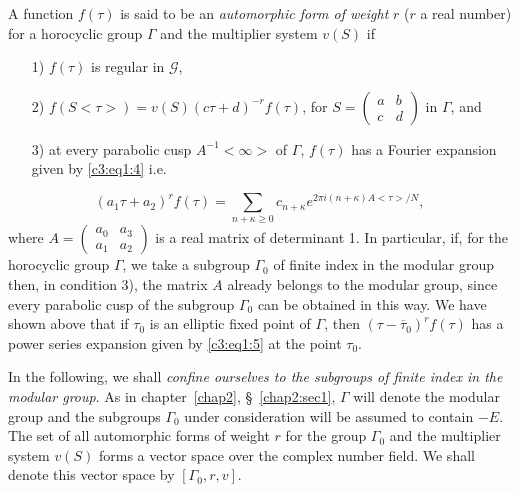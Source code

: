 \begin{defi*}
A function $f(\tau)$ is said to be an \textit{automorphic form of
  weight} $r$ ($r$ a real number) for a horocyclic group $\Gamma$ and
the multiplier system $v(S)$ if 
\begin{itemize}
\item[1)] $f(\tau)$ \pageoriginale is regular in $\mathscr{G}$, 

\item[2)] $f(S<\tau>)=v(S)(c\tau+d)^{-r}f(\tau)$, for $S =
  \left(\begin{smallmatrix} a&b\\c&d \end{smallmatrix} \right)$ in
  $\Gamma$, and 

\item[3)] at every parabolic cusp $A^{-1} <\infty>$ of $\Gamma$,
  $f(\tau)$ has a Fourier expansion given by \eqref{c3:eq1:4} i.e.
\end{itemize}
$$
(a_1\tau+a_2)^rf(\tau) = \sum_{n+\kappa \geq 0} c_{n+\kappa} e^{2\pi
  i(n+\kappa) A<\tau>/N},
$$
where $A=\left(\begin{smallmatrix} a_0&a_3\\a_1&a_2 \end{smallmatrix}
\right)$ is a real matrix of determinant 1. In particular, if, for the
horocyclic group $\Gamma$, we take a subgroup $\Gamma_0$ of finite
index in the modular group then, in condition 3), the matrix $A$
already belongs to the modular group, since every parabolic cusp of
the subgroup $\Gamma_0$ can be obtained in this way. We have shown
above that if $\tau_0$ is an elliptic fixed point of $\Gamma$, then
$(\tau-\overline{\tau}_0)^rf(\tau)$ has a power series expansion given
by \eqref{c3:eq1:5} at the point $\tau_0$. 
\end{defi*}

In the following, we shall \textit{confine ourselves to the subgroups
  of finite index in the modular group}. As in chapter~\ref{chap2}, 
\S~\ref{chap2:sec1}, $\Gamma$ will denote the modular group and the subgroups $\Gamma_0$
under consideration will be assumed to contain $-E$. The set of all
automorphic forms of weight $r$ for the group $\Gamma_0$ and the
multiplier system $v(S)$ forms a vector space over the complex number
field. We shall denote this vector space by $[\Gamma_0, r, v]$.

